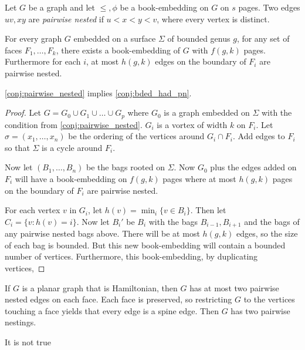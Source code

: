 


Let $G$ be a graph and let $\leq, \phi$ be a book-embedding on $G$ on $s$ pages. Two edges $uv, xy$ are \textit{pairwise nested} if $u < x < y < v$, where every vertex is distinct. 

\begin{conjecture}\label{conj:pairwise_nested}
    For every graph $G$ embedded on a surface $\Sigma$ of bounded genus $g$, for any set of faces $F_1, \ldots, F_k$, there exists a book-embedding of $G$ with $f(g, k)$ pages. Furthermore for each $i$, at most $h(g, k)$ edges on the boundary of $F_i$ are pairwise nested. 
\end{conjecture}

\cref{conj:pairwise_nested} implies \cref{conj:bded_had_pn}. 

\begin{proof}
    Let $G = G_0 \cup G_1 \cup \ldots \cup G_p$ where $G_0$ is a graph embedded on $\Sigma$ with the condition from \cref{conj:pairwise_nested}. $G_i$ is a vortex of width $k$ on $F_i$. Let $\sigma = (x_1, \ldots, x_n)$ be the ordering of the vertices around $G_i \cap F_i$. Add edges to $F_i$ so that $\Sigma$ is a cycle around $F_i$. 

    Now let $(B_1, \ldots, B_n)$ be the bags rooted on $\Sigma$. Now $G_0$ plus the edges added on $F_i$ will have a book-embedding on $f(g, k)$ pages where at most $h(g, k)$ pages on the boundary of $F_i$ are pairwise nested.

    For each vertex $v$ in $G_i$, let $h(v) = \min_i\{v \in B_i\}$. Then let $C_i = \{v : h(v) = i\}$. Now let $B_i'$ be $B_i$ with the bags $B_{i-1}, B_{i + 1}$ and the bags of any pairwise nested bags above. There will be at most $h(g, k)$ edges, so the size of each bag is bounded. But this new book-embedding will contain a bounded number of vertices. Furthermore, this book-embedding, by duplicating vertices, 
\end{proof}

If $G$ is a planar graph that is Hamiltonian, then $G$ has at most two pairwise nested edges on each face. Each face is preserved, so restricting $G$ to the vertices touching a face yields that every edge is a spine edge. Then $G$ has two pairwise nestings. 

It is not true 
